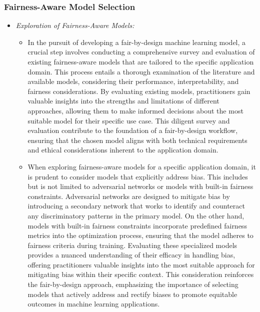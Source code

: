 \documentclass[12pt,a4paper,openright,twoside]{book}
\begin{document}

\subsubsection{Fairness-Aware Model Selection}

\begin{itemize}

    \item \emph{Exploration of Fairness-Aware Models:}
     
    \begin{itemize}
    
        \item In the pursuit of developing a fair-by-design machine learning model, a crucial step involves conducting a comprehensive survey and evaluation of existing fairness-aware models that are tailored to the specific application domain. This process entails a thorough examination of the literature and available models, considering their performance, interpretability, and fairness considerations. By evaluating existing models, practitioners gain valuable insights into the strengths and limitations of different approaches, allowing them to make informed decisions about the most suitable model for their specific use case. This diligent survey and evaluation contribute to the foundation of a fair-by-design workflow, ensuring that the chosen model aligns with both technical requirements and ethical considerations inherent to the application domain.
    
        \item When exploring fairness-aware models for a specific application domain, it is prudent to consider models that explicitly address bias. This includes but is not limited to adversarial networks or models with built-in fairness constraints. Adversarial networks are designed to mitigate bias by introducing a secondary network that works to identify and counteract any discriminatory patterns in the primary model. On the other hand, models with built-in fairness constraints incorporate predefined fairness metrics into the optimization process, ensuring that the model adheres to fairness criteria during training. Evaluating these specialized models provides a nuanced understanding of their efficacy in handling bias, offering practitioners valuable insights into the most suitable approach for mitigating bias within their specific context. This consideration reinforces the fair-by-design approach, emphasizing the importance of selecting models that actively address and rectify biases to promote equitable outcomes in machine learning applications.
    

\end{itemize}
\end{itemize}
\end{document}
